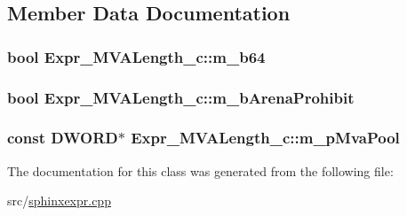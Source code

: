 \subsection{Member Data Documentation}
\hypertarget{classExpr__MVALength__c_a76229df82234dd86f864b01e8a2fa3c5}{
\subsubsection[{m\-\_\-b64}]{\setlength{\rightskip}{0pt plus 5cm}bool Expr\-\_\-\-M\-V\-A\-Length\-\_\-c\-::m\-\_\-b64\hspace{0.3cm}{\ttfamily [protected]}}}\label{classExpr__MVALength__c_a76229df82234dd86f864b01e8a2fa3c5}
\hypertarget{classExpr__MVALength__c_a7c9e953f3a34ec5273ab6251ef69ab20}{
\subsubsection[{m\-\_\-b\-Arena\-Prohibit}]{\setlength{\rightskip}{0pt plus 5cm}bool Expr\-\_\-\-M\-V\-A\-Length\-\_\-c\-::m\-\_\-b\-Arena\-Prohibit\hspace{0.3cm}{\ttfamily [protected]}}}\label{classExpr__MVALength__c_a7c9e953f3a34ec5273ab6251ef69ab20}
\hypertarget{classExpr__MVALength__c_a7fd65b36c8176d92ec2d41ec58f4b2f0}{
\subsubsection[{m\-\_\-p\-Mva\-Pool}]{\setlength{\rightskip}{0pt plus 5cm}const {\bf D\-W\-O\-R\-D}$\ast$ Expr\-\_\-\-M\-V\-A\-Length\-\_\-c\-::m\-\_\-p\-Mva\-Pool\hspace{0.3cm}{\ttfamily [protected]}}}\label{classExpr__MVALength__c_a7fd65b36c8176d92ec2d41ec58f4b2f0}


The documentation for this class was generated from the following file\-:\begin{DoxyCompactItemize}
\item 
src/\hyperlink{sphinxexpr_8cpp}{sphinxexpr.\-cpp}\end{DoxyCompactItemize}
